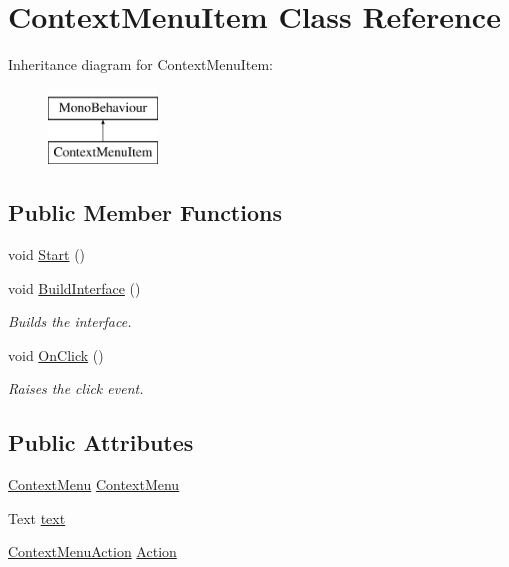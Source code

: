 \hypertarget{class_context_menu_item}{}\section{Context\+Menu\+Item Class Reference}
\label{class_context_menu_item}
Inheritance diagram for Context\+Menu\+Item\+:\begin{figure}[H]
\begin{center}
\leavevmode
\includegraphics[height=2.000000cm]{class_context_menu_item}
\end{center}
\end{figure}
\subsection*{Public Member Functions}
\begin{DoxyCompactItemize}
\item 
void \hyperlink{class_context_menu_item_abcb3d57f1638161497eb6ff4f1f442e8}{Start} ()
\item 
void \hyperlink{class_context_menu_item_a50a1e4f7c621e30572957b800ae70531}{Build\+Interface} ()
\begin{DoxyCompactList}\small\item\em Builds the interface. \end{DoxyCompactList}\item 
void \hyperlink{class_context_menu_item_aa48a85e990263932bf3ddff68abd3535}{On\+Click} ()
\begin{DoxyCompactList}\small\item\em Raises the click event. \end{DoxyCompactList}\end{DoxyCompactItemize}
\subsection*{Public Attributes}
\begin{DoxyCompactItemize}
\item 
\hyperlink{class_context_menu}{Context\+Menu} \hyperlink{class_context_menu_item_a627e9d82fe763f0af16a71819ac252fd}{Context\+Menu}
\item 
Text \hyperlink{class_context_menu_item_a8bbb51ac3e9e78943a861de4c644edb0}{text}
\item 
\hyperlink{class_context_menu_action}{Context\+Menu\+Action} \hyperlink{class_context_menu_item_a576fef6ddb53accdac1874467c39308c}{Action}
\end{DoxyCompactItemize}


